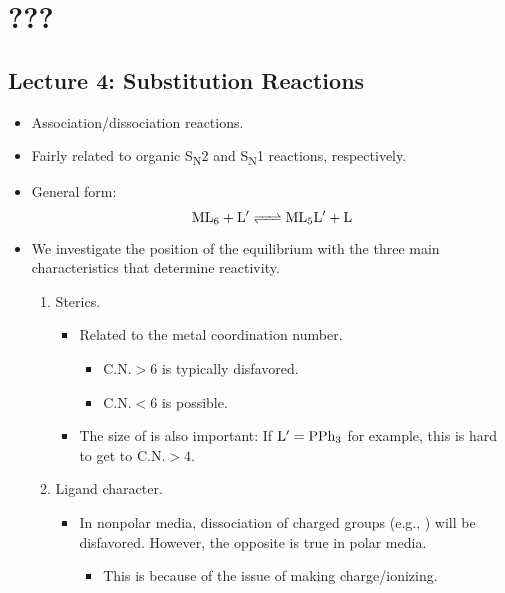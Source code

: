 \documentclass[../notes.tex]{subfiles}
\begin{document}
\chapter{???}
\section{Lecture 4: Substitution Reactions}
\begin{itemize}
    \item {}Association/dissociation reactions.
    \item Fairly related to organic S\textsubscript{N}2 and S\textsubscript{N}1 reactions, respectively.
    \item General form:
    \begin{equation*}
        \ce{ML6 + L$'$ <=> ML5L$'$ + L}
    \end{equation*}
    \item We investigate the position of the equilibrium with the three main characteristics that determine reactivity.
    \begin{enumerate}
        \item Sterics.
        \begin{itemize}
            \item Related to the metal coordination number.
            \begin{itemize}
                \item $\text{C.N.}>6$ is typically disfavored.
                \item $\text{C.N.}<6$ is possible.
            \end{itemize}
            \item The size of  is also important: If $\ce{L$'$}=\ce{PPh3}$ for example, this is hard to get to $\text{C.N.}>4$.
        \end{itemize}
        \item Ligand character.
        \begin{itemize}
            \item In nonpolar media, dissociation of charged groups (e.g., ) will be disfavored. However, the opposite is true in polar media.
            \begin{itemize}
                \item This is because of the issue of making charge/ionizing.
            \end{itemize}

\end{itemize}
\end{enumerate}
\end{itemize}
\end{document}
